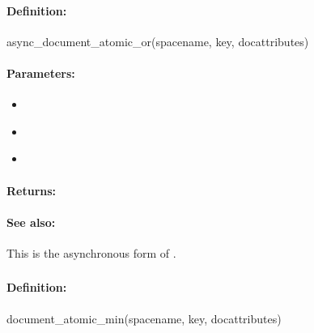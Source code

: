 \paragraph{Definition:}
\begin{rubycode}
async_document_atomic_or(spacename, key, docattributes)
\end{rubycode}

\paragraph{Parameters:}
\begin{itemize}[noitemsep]
\item {}\\

\item {}\\

\item {}\\

\end{itemize}

\paragraph{Returns:}


\paragraph{See also:}  This is the asynchronous form of .

\pagebreak
\subsubsection{}
\label{api:ruby:document_atomic_min}


\paragraph{Definition:}
\begin{rubycode}
document_atomic_min(spacename, key, docattributes)
\end{rubycode}

